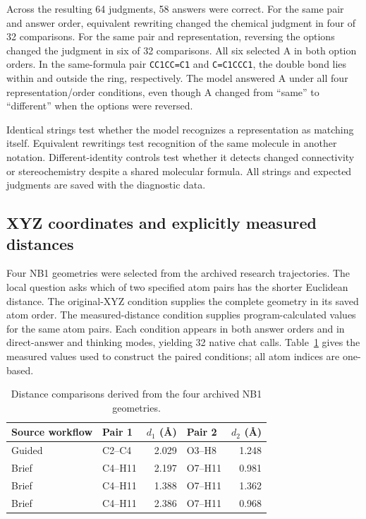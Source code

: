 Across the resulting 64 judgments, 58 answers were correct. For the same pair and answer order, equivalent rewriting changed the chemical judgment in four of 32 comparisons. For the same pair and representation, reversing the options changed the judgment in six of 32 comparisons. All six selected A in both option orders. In the same-formula pair \texttt{CC1CC=C1} and \texttt{C=C1CCC1}, the double bond lies within and outside the ring, respectively. The model answered A under all four representation/order conditions, even though A changed from ``same'' to ``different'' when the options were reversed.

Identical strings test whether the model recognizes a representation as matching itself. Equivalent rewritings test recognition of the same molecule in another notation. Different-identity controls test whether it detects changed connectivity or stereochemistry despite a shared molecular formula. All strings and expected judgments are saved with the diagnostic data.

\subsection{XYZ coordinates and explicitly measured distances}

Four NB1 geometries were selected from the archived research trajectories. The local question asks which of two specified atom pairs has the shorter Euclidean distance. The original-XYZ condition supplies the complete geometry in its saved atom order. The measured-distance condition supplies program-calculated values for the same atom pairs. Each condition appears in both answer orders and in direct-answer and thinking modes, yielding 32 native chat calls. Table~\ref{tab:si-distance-stimuli} gives the measured values used to construct the paired conditions; all atom indices are one-based.

\begin{table}[!htbp]
\centering\small
\caption{Distance comparisons derived from the four archived NB1 geometries.}
\label{tab:si-distance-stimuli}
\begin{tabular}{llrlr}
\toprule
Source workflow & Pair 1 & $d_1$ (\AA) & Pair 2 & $d_2$ (\AA)\\
\midrule
Guided & C2--C4 & 2.029 & O3--H8 & 1.248\\
Brief & C4--H11 & 2.197 & O7--H11 & 0.981\\
Brief & C4--H11 & 1.388 & O7--H11 & 1.362\\
Brief & C4--H11 & 2.386 & O7--H11 & 0.968\\
\bottomrule
\end{tabular}
\end{table}


